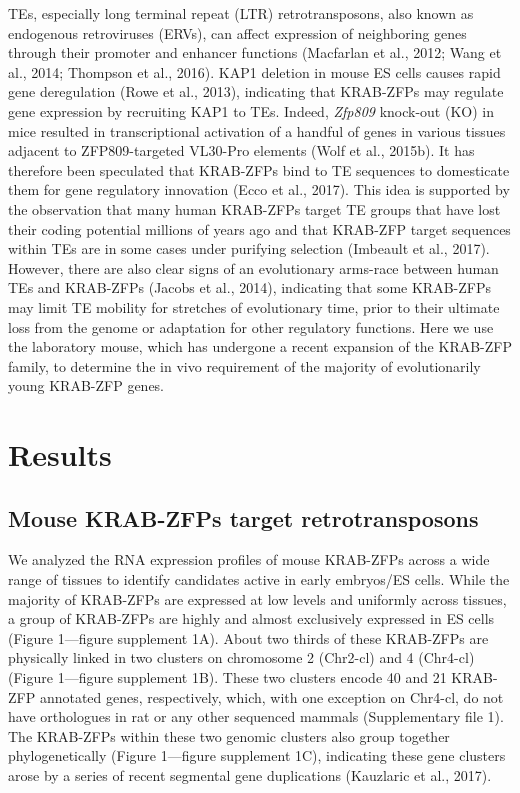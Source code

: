 \documentclass[11pt,a4paper]{article}
\begin{document}
TEs, especially long terminal repeat (LTR) retrotransposons, also known as endogenous retroviruses (ERVs), can affect expression of neighboring genes through their promoter and enhancer functions (Macfarlan et al., 2012; Wang et al., 2014; Thompson et al., 2016). KAP1 deletion in mouse ES cells causes rapid gene deregulation (Rowe et al., 2013), indicating that KRAB-ZFPs may regulate gene expression by recruiting KAP1 to TEs. Indeed, \textit{Zfp809} knock-out (KO) in mice resulted in transcriptional activation of a handful of genes in various tissues adjacent to ZFP809-targeted VL30-Pro elements (Wolf et al., 2015b). It has therefore been speculated that KRAB-ZFPs bind to TE sequences to domesticate them for gene regulatory innovation (Ecco et al., 2017). This idea is supported by the observation that many human KRAB-ZFPs target TE groups that have lost their coding potential millions of years ago and that KRAB-ZFP target sequences within TEs are in some cases under purifying selection (Imbeault et al., 2017). However, there are also clear signs of an evolutionary arms-race between human TEs and KRAB-ZFPs (Jacobs et al., 2014), indicating that some KRAB-ZFPs may limit TE mobility for stretches of evolutionary time, prior to their ultimate loss from the genome or adaptation for other regulatory functions. Here we use the laboratory mouse, which has undergone a recent expansion of the KRAB-ZFP family, to determine the in vivo requirement of the majority of evolutionarily young KRAB-ZFP genes.

\section{Results}

\subsection{Mouse KRAB-ZFPs target retrotransposons}

We analyzed the RNA expression profiles of mouse KRAB-ZFPs across a wide range of tissues to identify candidates active in early embryos/ES cells. While the majority of KRAB-ZFPs are expressed at low levels and uniformly across tissues, a group of KRAB-ZFPs are highly and almost exclusively expressed in ES cells (Figure 1—figure supplement 1A). About two thirds of these KRAB-ZFPs are physically linked in two clusters on chromosome 2 (Chr2-cl) and 4 (Chr4-cl) (Figure 1—figure supplement 1B). These two clusters encode 40 and 21 KRAB-ZFP annotated genes, respectively, which, with one exception on Chr4-cl, do not have orthologues in rat or any other sequenced mammals (Supplementary file 1). The KRAB-ZFPs within these two genomic clusters also group together phylogenetically (Figure 1—figure supplement 1C), indicating these gene clusters arose by a series of recent segmental gene duplications (Kauzlaric et al., 2017).
\end{document}
